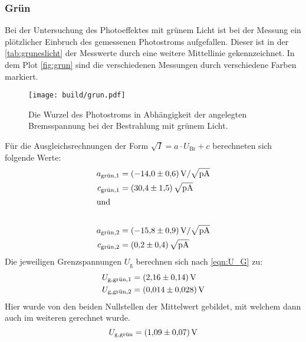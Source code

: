 \subsubsection{Grün}
Bei der Untersuchung des Photoeffektes mit grünem Licht ist bei der Messung ein plötzlicher Einbruch des gemessenen Photostroms aufgefallen.
Dieser ist in der \autoref{tab:gruneslicht} der Messwerte durch eine weitere Mittellinie gekennzeichnet.
In dem Plot \autoref{fig:grun} sind die verschiedenen Messungen durch verschiedene Farben markiert.
\begin{figure}[H]
  \centering
  \texttt{[image: build/grun.pdf]}
  \caption{Die Wurzel des Photostroms in Abhängigkeit der angelegten Bremsspannung bei der Bestrahlung mit grünem Licht.}
  \label{fig:grun}
\end{figure}
\noindent
Für die Ausgleichsrechnungen der Form $\sqrt{I} = a \cdot U_{\text{Br}} + c $ berechneten sich folgende Werte:
\begin{align*}
  a_{\text{grün},1} &= \SI{-14.0 \pm 0.6}{\volt\per\sqrt{\pico\ampere}}\\
  c_{\text{grün},1} &= \SI{30.4 \pm 1.5}{\sqrt{\pico\ampere}}\\
  \intertext{und}\\
  a_{\text{grün},2} &= \SI{-15.8 \pm 0.9}{\volt\per\sqrt{\pico\ampere}}\\
  c_{\text{grün},2} &= \SI{0.2 \pm 0.4}{\sqrt{\pico\ampere}}
\end{align*}
Die jeweiligen Grenzspannungen $U_{\text{g}}$ berechnen sich nach \eqref{eqn:U_G} zu:
\begin{align*}
  U_{\text{g},\text{grün},1} &= \SI{2.16 \pm 0.14}{\volt}\\
  U_{\text{g},\text{grün},2} &= \SI{0.014 \pm 0.028}{\volt}\\
\end{align*}
Hier wurde von den beiden Nullstellen der Mittelwert gebildet, mit welchem dann auch im weiteren gerechnet wurde.
\begin{equation*}
  U_{\text{g},\text{grün}} = \SI{1.09 \pm 0.07}{\volt}
\end{equation*}

